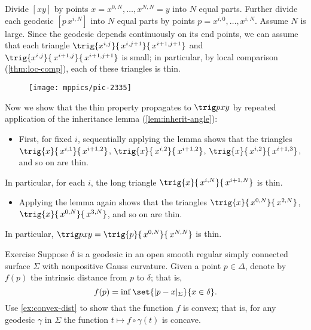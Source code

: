 Divide $[xy]$ by points $x=x^{0,N},\dots,x^{N,N}=y$ into $N$ equal parts.
Further divide each geodesic $[p\,x^{i,N}]$ into $N$ equal parts by points $p=x^{i,0},\dots,x^{i,N}$.
Assume $N$ is large.
Since the geodesic depends continuously on its end points, we can assume that each triangle 
 $\trig{x^{i,j}}{\,x^{i,j+1}}{\,x^{i+1,j+1}}$ and $\trig{x^{i,j}}{\,x^{i+1,j}}{\,x^{i+1,j+1}}$ is small;
 in particular, by local comparison (\ref{thm:loc-comp}), each of these triangles is thin. 
 
\begin{figure}[h!]
\vskip0mm
\centering
\texttt{[image: mppics/pic-2335]}
\end{figure}

Now we show that the thin property propagates to $\trig p x y$ by repeated application of the inheritance lemma (\ref{lem:inherit-angle}):
\begin{itemize}
\item 
First, for fixed $i$, 
sequentially applying the lemma shows  that the triangles 
$\trig{x}{\,x^{i,1}}{\,x^{i+1,2}}$, 
$\trig{x}{\,x^{i,2}}{\,x^{i+1,2}}$, 
$\trig{x}{\,x^{i,2}}{\,x^{i+1,3}}$,
and so on are thin. 
\end{itemize}
In particular, for each $i$, the long triangle $\trig{x}{\,x^{i,N}}{\,x^{i+1,N}}$ is thin.
\begin{itemize} 
\item 
Applying the lemma again shows that the  triangles $\trig{x}{\,x^{0,N}}{\,x^{2,N}}$, $\trig{x}{\,x^{0,N}}{\,x^{3,N}}$, and so on are thin. 
\end{itemize}
In particular, $\trig p x y=\trig{p}{\,x^{0,N}}{\,x^{N,N}}$ is thin.
\qeds




\begin{thm}{Exercise}\label{ex:convex-dist+}
Suppose $\delta$ is a geodesic in an open smooth regular simply connected surface $\Sigma$ with nonpositive Gauss curvature.
Given a point $p\in\Delta$, denote by $f(p)$ the intrinsic distance from $p$ to $\delta$;
that is,
\[f(p)=\inf\set{|p-x|_\Sigma}{x\in\delta}.\]
Use \ref{ex:convex-dist} to show that the function $f$ is convex;
that is, for any geodesic $\gamma$ in $\Sigma$ the function $t\mapsto f\circ\gamma(t)$ is concave.
\end{thm}
































